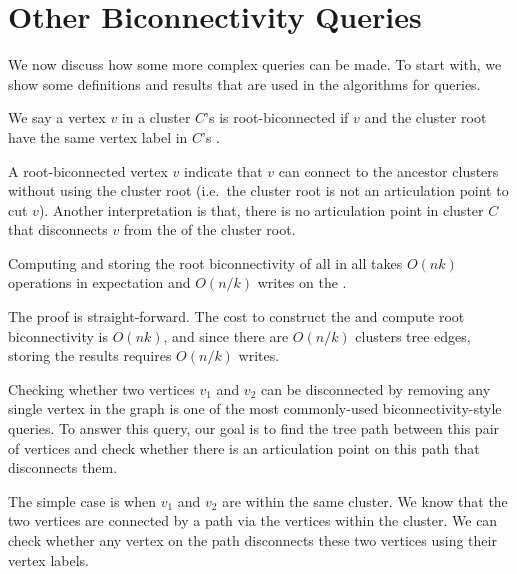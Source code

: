 \section{Other Biconnectivity Queries}\label{sec:morequires}

We now discuss how some more complex queries can be made.  To start with, we show some definitions and results that are used in the algorithms for queries.

\begin{definition}
We say a vertex $v$ in a cluster $C$'s \localgraph{} is root-biconnected if $v$ and the cluster root have the same vertex label in $C$'s \localgraph{}.
\end{definition}

A root-biconnected vertex $v$ indicate that $v$ can connect to the ancestor clusters without using the cluster root (i.e.\ the cluster root is not an articulation point to cut $v$).  Another interpretation is that, there is no articulation point in cluster $C$ that disconnects $v$ from the \outver{} of the cluster root.

\begin{lemma}
Computing and storing the root biconnectivity of all \outvers{} in all
 takes $O(nk)$ operations in expectation and $O(n/k)$ writes
on the \seqmodel.
\end{lemma}
The proof is straight-forward.  The cost to construct the  and compute root biconnectivity is $O(nk)$, and since there are $O(n/k)$ clusters tree edges, storing the results requires $O(n/k)$ writes.

Checking whether two vertices $v_1$ and $v_2$ can be disconnected by removing any single vertex in the graph is one of the most commonly-used biconnectivity-style queries.
To answer this query, our goal is to find the tree path between this pair of vertices and check whether there is an articulation point on this path that disconnects them.

The simple case is when $v_1$ and $v_2$ are within the same cluster.
We know that the two vertices are connected by a path via the vertices within the cluster. We can check whether any vertex on the path disconnects these two vertices using their vertex labels.

